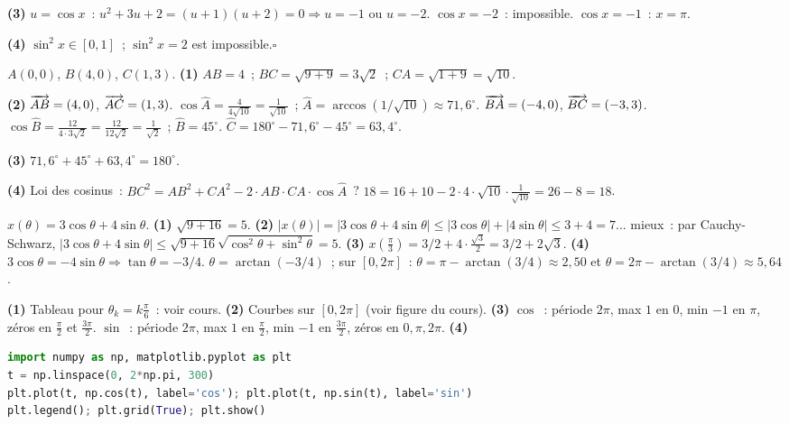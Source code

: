 \textbf{(3)} $u=\cos x$~: $u^2+3u+2=(u+1)(u+2)=0\Rightarrow u=-1$ ou $u=-2$.
$\cos x=-2$~: impossible. $\cos x=-1$~: $x=\pi$.

\textbf{(4)} $\sin^2x\in[0,1]$~; $\sin^2x=2$ est impossible.\hfill$\square$


$A(0,0)$, $B(4,0)$, $C(1,3)$.
\textbf{(1)} $AB=4$~; $BC=\sqrt{9+9}=3\sqrt{2}$~; $CA=\sqrt{1+9}=\sqrt{10}$.

\textbf{(2)} $\overrightarrow{AB}=(4,0)$, $\overrightarrow{AC}=(1,3)$.
$\cos\hat{A}=\frac{4}{4\sqrt{10}}=\frac{1}{\sqrt{10}}$~; $\hat{A}=\arccos(1/\sqrt{10})\approx71{,}6^{\circ}$.
$\overrightarrow{BA}=(-4,0)$, $\overrightarrow{BC}=(-3,3)$.
$\cos\hat{B}=\frac{12}{4\cdot3\sqrt{2}}=\frac{12}{12\sqrt{2}}=\frac{1}{\sqrt{2}}$~; $\hat{B}=45^{\circ}$.
$\hat{C}=180^{\circ}-71{,}6^{\circ}-45^{\circ}=63{,}4^{\circ}$.

\textbf{(3)} $71{,}6^{\circ}+45^{\circ}+63{,}4^{\circ}=180^{\circ}$.\checkmark

\textbf{(4)} Loi des cosinus~: $BC^2=AB^2+CA^2-2\cdot AB\cdot CA\cdot\cos\hat{A}$~?
$18=16+10-2\cdot4\cdot\sqrt{10}\cdot\frac{1}{\sqrt{10}}=26-8=18$.\checkmark


$x(\theta)=3\cos\theta+4\sin\theta$.
\textbf{(1)} $\sqrt{9+16}=5$.
\textbf{(2)} $|x(\theta)|=|3\cos\theta+4\sin\theta|\leq|3\cos\theta|+|4\sin\theta|\leq3+4=7$... mieux~:
par Cauchy-Schwarz, $|3\cos\theta+4\sin\theta|\leq\sqrt{9+16}\sqrt{\cos^2\theta+\sin^2\theta}=5$.\checkmark
\textbf{(3)} $x(\frac{\pi}{3})=3/2+4\cdot\frac{\sqrt{3}}{2}=3/2+2\sqrt{3}$.
\textbf{(4)} $3\cos\theta=-4\sin\theta\Rightarrow\tan\theta=-3/4$.
$\theta=\arctan(-3/4)$~; sur $[0,2\pi]$~: $\theta=\pi-\arctan(3/4)\approx2{,}50$ et $\theta=2\pi-\arctan(3/4)\approx5{,}64$.


\textbf{(1)} Tableau pour $\theta_k=k\frac{\pi}{6}$~: voir cours.
\textbf{(2)} Courbes sur $[0,2\pi]$ (voir figure du cours).
\textbf{(3)} $\cos$~: p\'eriode $2\pi$, max $1$ en $0$, min $-1$ en $\pi$, z\'eros en $\frac{\pi}{2}$ et $\frac{3\pi}{2}$.
$\sin$~: p\'eriode $2\pi$, max $1$ en $\frac{\pi}{2}$, min $-1$ en $\frac{3\pi}{2}$, z\'eros en $0,\pi,2\pi$.
\textbf{(4)}
\begin{lstlisting}[language=Python]
import numpy as np, matplotlib.pyplot as plt
t = np.linspace(0, 2*np.pi, 300)
plt.plot(t, np.cos(t), label='cos'); plt.plot(t, np.sin(t), label='sin')
plt.legend(); plt.grid(True); plt.show()
\end{lstlisting}

